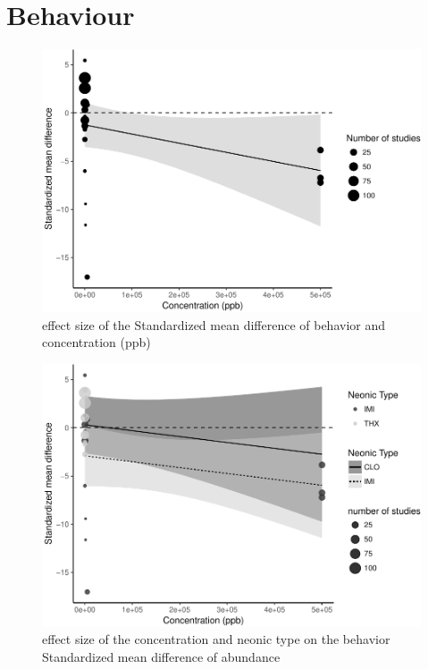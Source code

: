 \documentclass[]{elsarticle} %
\makeatletter
\def\maxwidth{\ifdim\Gin@nat@width>\linewidth\linewidth
\else\Gin@nat@width\fi}
\let\Oldincludegraphics\includegraphics
\renewcommand{\includegraphics}[1]{\Oldincludegraphics[width=\maxwidth]{#1}}
\makeatother
\begin{document}
\section{Behaviour}\label{behaviour}

\begin{figure}[htbp]
\centering
\includegraphics{MetanalysisNeonics_files/figure-latex/unnamed-chunk-16-1.pdf}
\caption{effect size of the Standardized mean difference of behavior and
concentration (ppb)}
\end{figure}

\begin{figure}[htbp]
\centering
\includegraphics{MetanalysisNeonics_files/figure-latex/unnamed-chunk-18-1.pdf}
\caption{effect size of the concentration and neonic type on the
behavior Standardized mean difference of abundance}
\end{figure}
\end{document}

